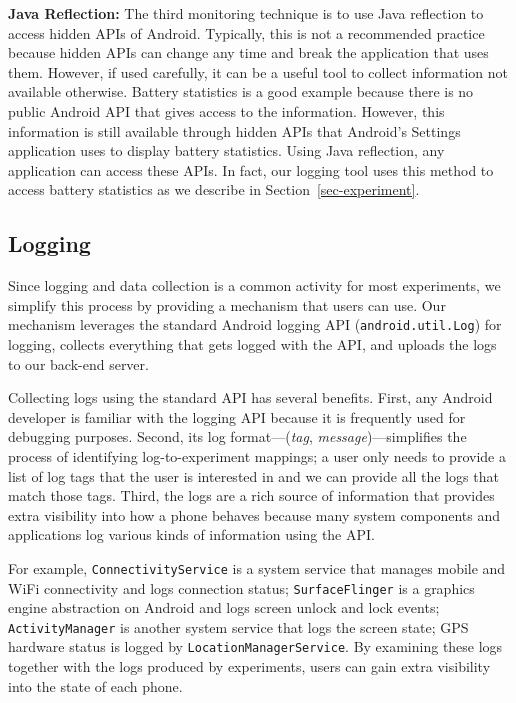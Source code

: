 {\bf Java Reflection:} The third monitoring technique is to use Java reflection
to access hidden APIs of Android. Typically, this is not a recommended practice
because hidden APIs can change any time and break the application that uses
them. However, if used carefully, it can be a useful tool to collect information
not available otherwise. Battery statistics is a good example because there is
no public Android API that gives access to the information. However, this
information is still available through hidden APIs that Android's Settings
application uses to display battery statistics. Using Java reflection, any
application can access these APIs. In fact, our logging tool uses this method to
access battery statistics as we describe in Section~\ref{sec-experiment}.

\subsection{Logging}

Since logging and data collection is a common activity for most experiments, we
simplify this process by providing a mechanism that \PhoneLab{} users can use.
Our mechanism leverages the standard Android logging API
(\texttt{android.util.Log}) for logging, collects everything that gets logged
with the API, and uploads the logs to our back-end server.

Collecting logs using the standard API has several benefits. First, any Android
developer is familiar with the logging API because it is frequently used for
debugging purposes. Second, its log format---({\it tag}, {\it
message})---simplifies the process of identifying log-to-experiment mappings; a
\PhoneLab{} user only needs to provide a list of log tags that the user is
interested in and we can provide all the logs that match those tags. Third, the
logs are a rich source of information that provides extra visibility into how a
phone behaves because many system components and applications log various kinds
of information using the API.

For example, \texttt{ConnectivityService} is a system service that manages
mobile and WiFi connectivity and logs connection status; \texttt{SurfaceFlinger}
is a graphics engine abstraction on Android and logs screen unlock and lock
events; \texttt{ActivityManager} is another system service that logs the screen
state; GPS hardware status is logged by \texttt{LocationManagerService}. By
examining these logs together with the logs produced by experiments, \PhoneLab{}
users can gain extra visibility into the state of each phone.

